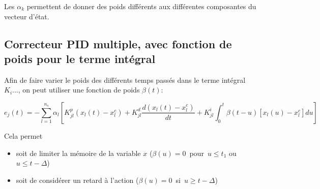 \documentclass[a4paper,12pt]{article}
\begin{document}
Les $\alpha_k$ permettent de donner des poids différents aux différentes composantes du vecteur d'état.


\subsection{Correcteur PID multiple, avec fonction de poids pour le terme intégral}

Afin de faire varier le poids des différents temps passés dans le terme intégral $K_i \ldots$, on peut utiliser une fonction de poids $\beta(t)$:

\begin{equation} 
  e_{j}(t)=-\sum_{l=1}^{n_s}\alpha_l \left[K_{jl}^p(x_l(t)-x_l^c) + 
                                           K_{jl}^d\frac{d(x_l(t)-x^c_l)}{dt} +
                                           K^i_{jl}\int_0^{t}\beta(t-u) \left[x_l(u)-x^c_l\right] du \right]
\end{equation}

Cela permet 
\begin{itemize}
  \item soit de limiter la mémoire de la variable $x$ ($\beta(u)=0$\ pour\  $u\le t_1$ ou $u\le t-\Delta $)
  \item soit de considérer un retard à l'action ($\beta(u)=0$\ si\ $u\ge t-\Delta $)
\end{itemize}
\end{document}
